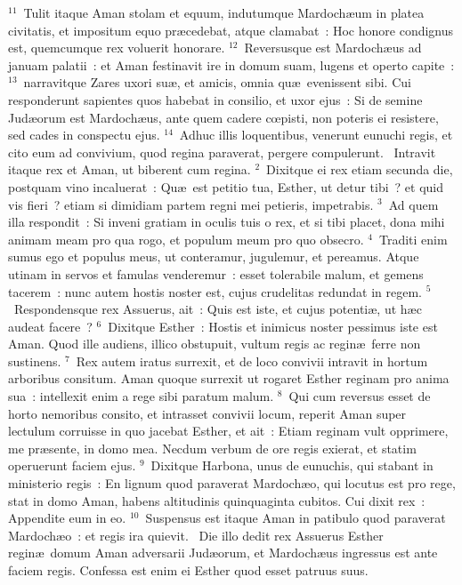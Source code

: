 ${}^{11}$~Tulit itaque Aman stolam et equum, indutumque Mardoch\ae um in platea civitatis, et impositum equo pr\ae cedebat, atque clamabat~: Hoc honore condignus est, quemcumque rex voluerit honorare.
${}^{12}$~Reversusque est Mardoch\ae us ad januam palatii~: et Aman festinavit ire in domum suam, lugens et operto capite~:
${}^{13}$~narravitque Zares uxori su\ae , et amicis, omnia qu\ae\ evenissent sibi. Cui responderunt sapientes quos habebat in consilio, et uxor ejus~: Si de semine Jud\ae orum est Mardoch\ae us, ante quem cadere cœpisti, non poteris ei resistere, sed cades in conspectu ejus.
${}^{14}$~Adhuc illis loquentibus, venerunt eunuchi regis, et cito eum ad convivium, quod regina paraverat, pergere compulerunt.
~Intravit itaque rex et Aman, ut biberent cum regina.
${}^{2}$~Dixitque ei rex etiam secunda die, postquam vino incaluerat~: Qu\ae\ est petitio tua, Esther, ut detur tibi~? et quid vis fieri~? etiam si dimidiam partem regni mei petieris, impetrabis.
${}^{3}$~Ad quem illa respondit~: Si inveni gratiam in oculis tuis o rex, et si tibi placet, dona mihi animam meam pro qua rogo, et populum meum pro quo obsecro.
${}^{4}$~Traditi enim sumus ego et populus meus, ut conteramur, jugulemur, et pereamus. Atque utinam in servos et famulas venderemur~: esset tolerabile malum, et gemens tacerem~: nunc autem hostis noster est, cujus crudelitas redundat in regem.
${}^{5}$~Respondensque rex Assuerus, ait~: Quis est iste, et cujus potenti\ae , ut h\ae c audeat facere~?
${}^{6}$~Dixitque Esther~: Hostis et inimicus noster pessimus iste est Aman. Quod ille audiens, illico obstupuit, vultum regis ac regin\ae\ ferre non sustinens.
${}^{7}$~Rex autem iratus surrexit, et de loco convivii intravit in hortum arboribus consitum. Aman quoque surrexit ut rogaret Esther reginam pro anima sua~: intellexit enim a rege sibi paratum malum.
${}^{8}$~Qui cum reversus esset de horto nemoribus consito, et intrasset convivii locum, reperit Aman super lectulum corruisse in quo jacebat Esther, et ait~: Etiam reginam vult opprimere, me pr\ae sente, in domo mea. Necdum verbum de ore regis exierat, et statim operuerunt faciem ejus.
${}^{9}$~Dixitque Harbona, unus de eunuchis, qui stabant in ministerio regis~: En lignum quod paraverat Mardoch\ae o, qui locutus est pro rege, stat in domo Aman, habens altitudinis quinquaginta cubitos. Cui dixit rex~: Appendite eum in eo.
${}^{10}$~Suspensus est itaque Aman in patibulo quod paraverat Mardoch\ae o~: et regis ira quievit.
~Die illo dedit rex Assuerus Esther regin\ae\ domum Aman adversarii Jud\ae orum, et Mardoch\ae us ingressus est ante faciem regis. Confessa est enim ei Esther quod esset patruus suus.
